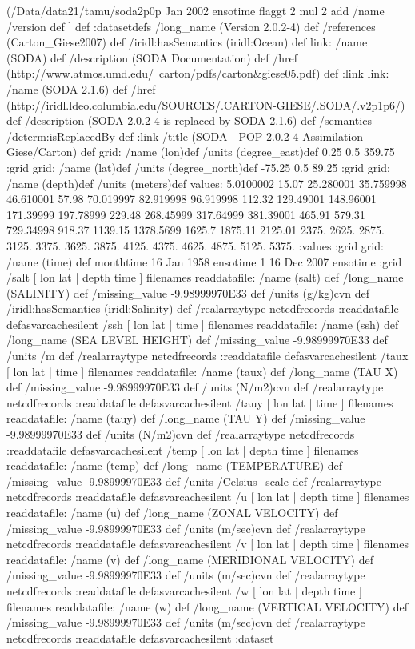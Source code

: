\begin{ingrid}
{(/Data/data21/tamu/soda2p0p%
         Jan 2002 ensotime
         flaggt
        2 mul
        2 add
        /name /version def
        ]
} def
:datasetdefs
/long_name (Version 2.0.2-4) def
/references (Carton_Giese2007) def
/iridl:hasSemantics (iridl:Ocean) def
link:
/name (SODA) def
/description (SODA Documentation) def
/href (http://www.atmos.umd.edu/~carton/pdfs/carton&giese05.pdf) def
:link
link:
/name (SODA 2.1.6) def
/href (http://iridl.ldeo.columbia.edu/SOURCES/.CARTON-GIESE/.SODA/.v2p1p6/) def
/description (SODA 2.0.2-4 is replaced by SODA 2.1.6) def
/semantics /dcterm:isReplacedBy def
:link
/title (SODA - POP 2.0.2-4 Assimilation Giese/Carton) def
grid:
/name (lon)def
/units (degree_east)def
 0.25 0.5 359.75
:grid
grid:
/name (lat)def
/units (degree_north)def
 -75.25 0.5 89.25
:grid
grid:
/name (depth)def
/units (meters)def
values: 5.0100002 15.07 25.280001 35.759998 46.610001 57.98 70.019997 82.919998 96.919998 112.32 129.49001 148.96001 171.39999 197.78999 229.48 268.45999 317.64999 381.39001 465.91 579.31 729.34998 918.37 1139.15 1378.5699 1625.7 1875.11 2125.01 2375. 2625. 2875. 3125. 3375. 3625. 3875. 4125. 4375. 4625. 4875. 5125. 5375. :values
:grid
grid:
/name (time) def
monthtime
16 Jan 1958 ensotime
1
16 Dec 2007 ensotime
:grid
 /salt{
[ lon lat | depth time ] filenames readdatafile:
/name (salt) def
 /long_name (SALINITY) def
 /missing_value -9.98999970E33 def
 /units (g/kg)cvn def
/iridl:hasSemantics (iridl:Salinity) def
 /realarraytype netcdfrecords :readdatafile
}defasvarcachesilent
 /ssh{
[ lon lat | time ] filenames readdatafile:
/name (ssh) def
 /long_name (SEA LEVEL HEIGHT) def
 /missing_value -9.98999970E33 def
 /units /m def
 /realarraytype netcdfrecords :readdatafile
}defasvarcachesilent
 /taux{
[ lon lat | time ] filenames readdatafile:
/name (taux) def
 /long_name (TAU X) def
 /missing_value -9.98999970E33 def
 /units (N/m2)cvn def
 /realarraytype netcdfrecords :readdatafile
}defasvarcachesilent
 /tauy{
[ lon lat | time ] filenames readdatafile:
/name (tauy) def
 /long_name (TAU Y) def
 /missing_value -9.98999970E33 def
 /units (N/m2)cvn def
 /realarraytype netcdfrecords :readdatafile
}defasvarcachesilent
 /temp{
[ lon lat | depth time ] filenames readdatafile:
/name (temp) def
 /long_name (TEMPERATURE) def
 /missing_value -9.98999970E33 def
 /units /Celsius_scale def
 /realarraytype netcdfrecords :readdatafile
}defasvarcachesilent
 /u{
[ lon lat | depth time ] filenames readdatafile:
/name (u) def
 /long_name (ZONAL VELOCITY) def
 /missing_value -9.98999970E33 def
 /units (m/sec)cvn def
 /realarraytype netcdfrecords :readdatafile
}defasvarcachesilent
 /v{
[ lon lat | depth time ] filenames readdatafile:
/name (v) def
 /long_name (MERIDIONAL VELOCITY) def
 /missing_value -9.98999970E33 def
 /units (m/sec)cvn def
 /realarraytype netcdfrecords :readdatafile
}defasvarcachesilent
 /w{
[ lon lat | depth time ] filenames readdatafile:
/name (w) def
 /long_name (VERTICAL VELOCITY) def
 /missing_value -9.98999970E33 def
 /units (m/sec)cvn def
 /realarraytype netcdfrecords :readdatafile
}defasvarcachesilent
:dataset
\end{ingrid}
